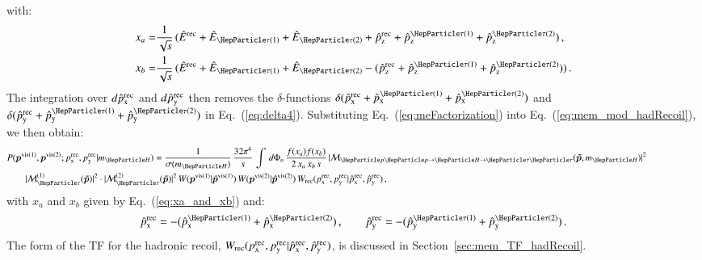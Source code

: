 with:
\begin{align}
x_{a} = & \frac{1}{\sqrt{s}} \, (\Ehat^{\rec} + \Ehat_{\Pgt(1)} +
\Ehat_{\Pgt(2)} + \pZhat^{\rec} + \pZhat^{\Pgt(1)} + \pZhat^{\Pgt(2)})
\, , \nonumber \\
x_{b} = & \frac{1}{\sqrt{s}} \, (\Ehat^{\rec} + \Ehat_{\Pgt(1)} + \Ehat_{\Pgt(2)} - (\pZhat^{\rec} + \pZhat^{\Pgt(1)} + \pZhat^{\Pgt(2)})) \, .
\label{eq:xa_and_xb}
\end{align}
The integration over $d\hat{p}_{\textrm{x}}^{\textrm{rec}}$ and $d\hat{p}_{\textrm{y}}^{\textrm{rec}}$ then removes the $\delta$-functions 
$\delta( \pXhat^{\rec} + \pXhat^{\Pgt(1)} + \pXhat^{\Pgt(2)} )$ and
$\delta( \pYhat^{\rec} + \pYhat^{\Pgt(1)} + \pYhat^{\Pgt(2)} )$ in Eq.~(\ref{eq:delta4}).
Substituting Eq.~(\ref{eq:meFactorization}) into Eq.~(\ref{eq:mem_mod_hadRecoil}), we then obtain:
\begin{align}
&
P(\bm{p}^{\vis(1)},\bm{p}^{\vis(2)};\pX^{\rec},\pY^{\rec}|m_{\PHiggs})
= \frac{1}{\sigma(m_{\PHiggs})} \, \frac{32\pi^{4}}{s} \, \int \,
 d\Phi_{n} \, \frac{f(x_{a}) f(x_{b})}{2 \, x_{a} \, x_{b} \, s} \, 
 \vert \mathcal{M}_{\Pp\Pp \to \PHiggs \to \Pgt\Pgt}(\bm{\tilde{p}},m_{\PHiggs}) \vert^{2} \, \hspace{2cm} \nonumber \\
& \qquad \vert \mathcal{M}^{(1)}_{\Pgt}(\bm{\tilde{p}}) \vert^{2} 
 \cdot \vert \mathcal{M}^{(2)}_{\Pgt}(\bm{\tilde{p}}) \vert^{2} \, 
 W(\bm{p}^{\vis(1)}|\bm{\hat{p}}^{\vis(1)}) \, W(\bm{p}^{\vis(2)}|\bm{\hat{p}}^{\vis(2)}) \, W_{\rec}( \pX^{\rec},\pY^{\rec} | \pXhat^{\rec},\pYhat^{\rec} ) \, ,
\label{eq:mem_with_hadRecoil}
\end{align}
with $x_{a}$ and $x_{b}$ given by Eq.~(\ref{eq:xa_and_xb}) and:
\begin{equation}
\pXhat^{\rec} = -(\pXhat^{\Pgt(1)} + \pXhat^{\Pgt(2)}) \, ,
\qquad \pYhat^{\rec} = -(\pYhat^{\Pgt(1)} + \pYhat^{\Pgt(2)}) \, .
\label{eq:xpXhat_and_pYhat}
\end{equation}
The form of the TF for the hadronic recoil, $W_{\textrm{rec}}( p_{\textrm{x}}^{\textrm{rec}},p_{\textrm{y}}^{\textrm{rec}} | \hat{p}_{\textrm{x}}^{\textrm{rec}},\hat{p}_{\textrm{y}}^{\textrm{rec}} )$, is
discussed in Section~\ref{sec:mem_TF_hadRecoil}.

